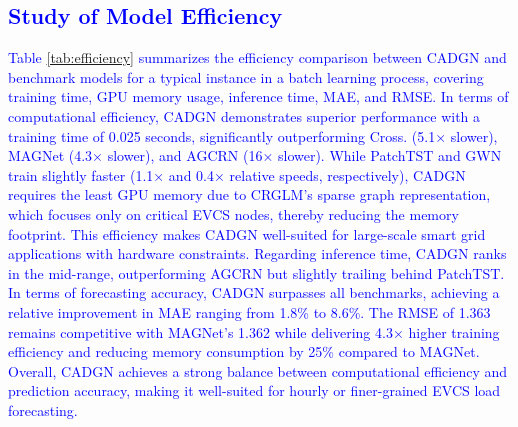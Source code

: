 \documentclass[lettersize,journal]{IEEEtran}
\newcommand{\hl}[1]{\textcolor{blue}{#1}}
\begin{document}

\subsection{\hl{Study of Model Efficiency}}

\hl{Table \ref{tab:efficiency} summarizes the efficiency comparison between CADGN and benchmark models for a typical instance in a batch learning process, covering training time, GPU memory usage, inference time, MAE, and RMSE. In terms of computational efficiency, CADGN demonstrates superior performance with a training time of 0.025 seconds, significantly outperforming Cross. (5.1× slower), MAGNet (4.3× slower), and AGCRN (16× slower). While PatchTST and GWN train slightly faster (1.1× and 0.4× relative speeds, respectively), CADGN requires the least GPU memory due to CRGLM’s sparse graph representation, which focuses only on critical EVCS nodes, thereby reducing the memory footprint. This efficiency makes CADGN well-suited for large-scale smart grid applications with hardware constraints. 
Regarding inference time, CADGN ranks in the mid-range, outperforming AGCRN but slightly trailing behind PatchTST. In terms of forecasting accuracy, CADGN surpasses all benchmarks, achieving a relative improvement in MAE ranging from 1.8\% to 8.6\%. The RMSE of 1.363 remains competitive with MAGNet's 1.362 while delivering 4.3× higher training efficiency and reducing memory consumption by 25\% compared to MAGNet.
Overall, CADGN achieves a strong balance between computational efficiency and prediction accuracy, making it well-suited for hourly or finer-grained EVCS load forecasting.}
\end{document}
